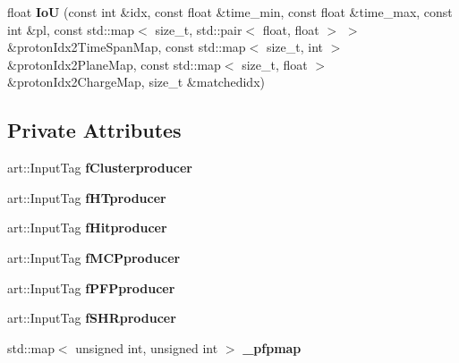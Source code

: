 \begin{DoxyCompactItemize}
\item 
float {\bfseries IoU} (const int \&idx, const float \&time\+\_\+min, const float \&time\+\_\+max, const int \&pl, const std\+::map$<$ size\+\_\+t, std\+::pair$<$ float, float $>$ $>$ \&proton\+Idx2\+Time\+Span\+Map, const std\+::map$<$ size\+\_\+t, int $>$ \&proton\+Idx2\+Plane\+Map, const std\+::map$<$ size\+\_\+t, float $>$ \&proton\+Idx2\+Charge\+Map, size\+\_\+t \&matchedidx)\hypertarget{classProtonHitPurity_a947d6c3c40631fdfb260eee9aea4f439}{}\label{classProtonHitPurity_a947d6c3c40631fdfb260eee9aea4f439}

\end{DoxyCompactItemize}
\subsection*{Private Attributes}
\begin{DoxyCompactItemize}
\item 
art\+::\+Input\+Tag {\bfseries f\+Clusterproducer}\hypertarget{classProtonHitPurity_a9cde3bb38128414175bdec828c258628}{}\label{classProtonHitPurity_a9cde3bb38128414175bdec828c258628}

\item 
art\+::\+Input\+Tag {\bfseries f\+H\+Tproducer}\hypertarget{classProtonHitPurity_a67a39931d4884a9b8551d5158f37c954}{}\label{classProtonHitPurity_a67a39931d4884a9b8551d5158f37c954}

\item 
art\+::\+Input\+Tag {\bfseries f\+Hitproducer}\hypertarget{classProtonHitPurity_a7285b631733a327b17852217edcf130c}{}\label{classProtonHitPurity_a7285b631733a327b17852217edcf130c}

\item 
art\+::\+Input\+Tag {\bfseries f\+M\+C\+Pproducer}\hypertarget{classProtonHitPurity_a582ca83452036a5a15bde53595858dab}{}\label{classProtonHitPurity_a582ca83452036a5a15bde53595858dab}

\item 
art\+::\+Input\+Tag {\bfseries f\+P\+F\+Pproducer}\hypertarget{classProtonHitPurity_a58af404af2943b95545b5435f984b34c}{}\label{classProtonHitPurity_a58af404af2943b95545b5435f984b34c}

\item 
art\+::\+Input\+Tag {\bfseries f\+S\+H\+Rproducer}\hypertarget{classProtonHitPurity_ae02e24d9473737eba23b266383f240b0}{}\label{classProtonHitPurity_ae02e24d9473737eba23b266383f240b0}

\item 
std\+::map$<$ unsigned int, unsigned int $>$ {\bfseries \+\_\+pfpmap}\hypertarget{classProtonHitPurity_abaa0fd0f88cca733f6e1f58248d22e9b}{}\label{classProtonHitPurity_abaa0fd0f88cca733f6e1f58248d22e9b}


\end{DoxyCompactItemize}
